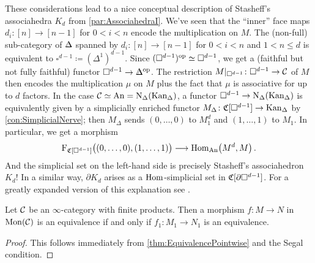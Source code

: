\begin{numpar}
	These considerations lead to a nice conceptual description of Stasheff's associahedra $K_d$ from \cref{par:AssociahedraI}. We've seen that the \enquote{inner} face maps $d_i\colon [n]\rightarrow [n-1]$ for $0<i<n$ encode the multiplication on $M$. The (non-full) sub-category of $\IDelta$ spanned by $d_i\colon [n]\rightarrow [n-1]$ for $0<i<n$ and $1<n\leqslant d$ is equivalent to $\square^{d-1}\coloneqq (\Delta^1)^{d-1}$. Since $(\square^{d-1})^{\mathrm{op}}\simeq \square^{d-1}$, we get a (faithful but not fully faithful) functor $\square^{d-1}\rightarrow\IDelta^\op$. The restriction $M|_{\square^{d-1}}\colon \square^{d-1}\rightarrow \mathcal{C}$ of $M$ then encodes the multiplication $\mu$ on $M$ plus the fact that $\mu$ is associative for up to $d$ factors. In the case $\mathcal{C}\simeq \mathrm{An}=\operatorname{N}_\Delta(\mathrm{Kan}_\Delta)$, a functor $\square^{d-1}\rightarrow\operatorname{N}_\Delta(\mathrm{Kan}_\Delta)$ is equivalently given by a simplicially enriched functor $M_\Delta\colon\mathfrak{C}[\square^{d-1}]\rightarrow\mathrm{Kan}_\Delta$ by \cref{con:SimplicialNerve}; then $M_\Delta$ sends $(0,\dotsc,0)$ to $M_1^d$ and $(1,\dotsc,1)$ to $M_1$. In particular, we get a morphism
	\begin{equation*}
		\F_{\CC[\square^{d-1}]}\lef((0,\dotsc,0),(1,\dotsc,1)\righ)\longrightarrow \Hom_{\cat{An}}\bigl(M^d,M\bigr)\,.
	\end{equation*}
	And the simplicial set on the left-hand side is precisely Stasheff's associahedron $K_d$! In a similar way, $\partial K_d$ arises as a $\operatorname{Hom}$-simplicial set in $\mathfrak{C}[\partial\square^{d-1}]$. For a greatly expanded version of this explanation see \cite[\S\href{https://people.math.harvard.edu/~lurie/papers/HA.pdf\#subsection.4.1.6}{4.1.6}]{HA}.
\end{numpar}
\begin{lem}\label{lem:E1MonoidsEquivalenceOnUnderlyingObjects}
	Let $\mathcal{C}$ be an $\infty$-category with finite products. Then a morphism $f\colon M\rightarrow N$ in $\mathrm{Mon}(\mathcal{C})$ is an equivalence if and only if $f_1\colon M_1\rightarrow N_1$ is an equivalence. 
\end{lem}
\begin{proof}
	This follows immediately from \cref{thm:EquivalencePointwise} and the Segal condition.
\end{proof}
